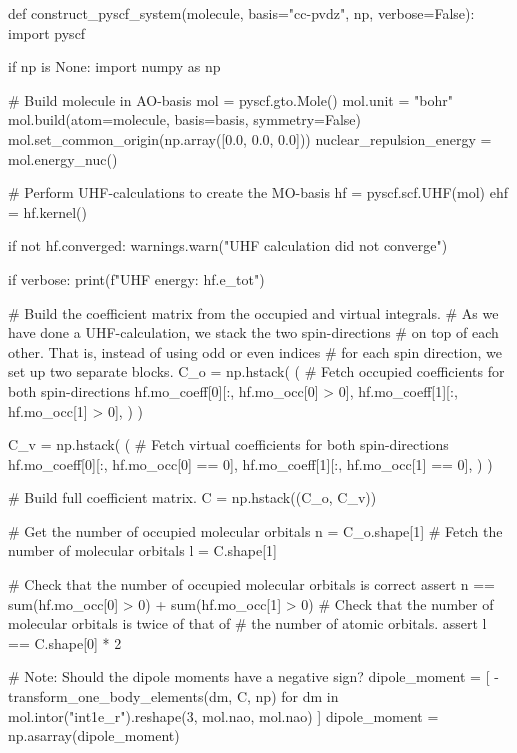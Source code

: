 \begin{python}
def construct_pyscf_system(molecule, basis="cc-pvdz", np, verbose=False):
    import pyscf

    if np is None:
        import numpy as np

    # Build molecule in AO-basis
    mol = pyscf.gto.Mole()
    mol.unit = "bohr"
    mol.build(atom=molecule, basis=basis, symmetry=False)
    mol.set_common_origin(np.array([0.0, 0.0, 0.0]))
    nuclear_repulsion_energy = mol.energy_nuc()

    # Perform UHF-calculations to create the MO-basis
    hf = pyscf.scf.UHF(mol)
    ehf = hf.kernel()

    if not hf.converged:
        warnings.warn("UHF calculation did not converge")

    if verbose:
        print(f"UHF energy: {hf.e_tot}")

    # Build the coefficient matrix from the occupied and virtual integrals.
    # As we have done a UHF-calculation, we stack the two spin-directions 
    # on top of each other. That is, instead of using odd or even indices
    # for each spin direction, we set up two separate blocks.
    C_o = np.hstack(
        (
            # Fetch occupied coefficients for both spin-directions
            hf.mo_coeff[0][:, hf.mo_occ[0] > 0],
            hf.mo_coeff[1][:, hf.mo_occ[1] > 0],
        )
    )

    C_v = np.hstack(
        (
            # Fetch virtual coefficients for both spin-directions
            hf.mo_coeff[0][:, hf.mo_occ[0] == 0],
            hf.mo_coeff[1][:, hf.mo_occ[1] == 0],
        )
    )

    # Build full coefficient matrix.
    C = np.hstack((C_o, C_v))

    # Get the number of occupied molecular orbitals
    n = C_o.shape[1]
    # Fetch the number of molecular orbitals
    l = C.shape[1]

    # Check that the number of occupied molecular orbitals is correct
    assert n == sum(hf.mo_occ[0] > 0) + sum(hf.mo_occ[1] > 0)
    # Check that the number of molecular orbitals is twice of that of
    # the number of atomic orbitals.
    assert l == C.shape[0] * 2

    # Note: Should the dipole moments have a negative sign?
    dipole_moment = [
        -transform_one_body_elements(dm, C, np)
        for dm in mol.intor("int1e_r").reshape(3, mol.nao, mol.nao)
    ]
    dipole_moment = np.asarray(dipole_moment)


\end{python}
